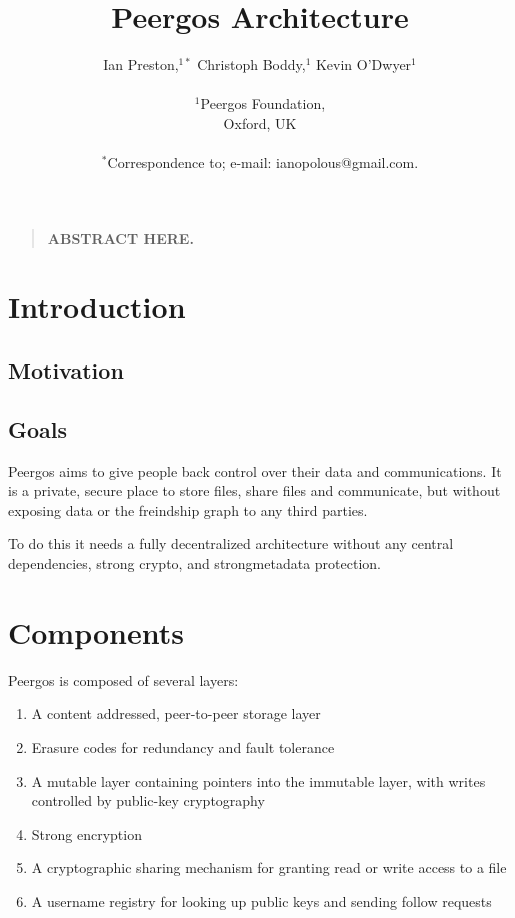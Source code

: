\documentclass[12pt]{article}
\title{Peergos Architecture}
\author
{Ian Preston,$^{1\ast}$ Christoph Boddy,$^{1}$ Kevin O'Dwyer$^{1}$\\
\\
\normalsize{$^{1}$Peergos Foundation,}\\
\normalsize{Oxford, UK}\\
\\
\normalsize{$^\ast$Correspondence to; e-mail:  ianopolous@gmail.com.}
}
\date{}
\newenvironment{sciabstract}{%
\begin{quote} \bf}
{\end{quote}}
\begin{document}
 


\baselineskip24pt


\maketitle 




\begin{sciabstract}
        ABSTRACT  HERE.
\end{sciabstract}


\section*{Introduction}

\subsection*{Motivation}


\subsection*{Goals}
Peergos aims to give people back control over their data and communications. It is a private, secure place to store files, share files and communicate, but without exposing data or the freindship graph to any third parties. 

To do this it needs a fully decentralized architecture without any central dependencies, strong crypto, and strongmetadata protection. 

\section*{Components}
Peergos is composed of several layers:

\begin{enumerate}
\item A content addressed, peer-to-peer storage layer
\item Erasure codes for redundancy and fault tolerance
\item A mutable layer containing pointers into the immutable layer, with writes controlled by public-key cryptography
\item Strong encryption
\item A cryptographic sharing mechanism for granting read or write access to a file
\item A username registry for looking up public keys and sending follow requests
\end{enumerate}
\end{document}
